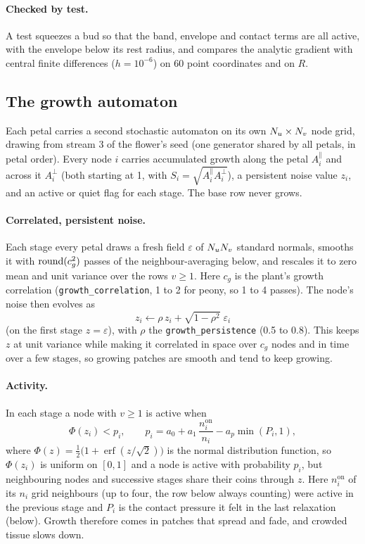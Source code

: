 \paragraph{Checked by test.} A test squeezes a bud so that the band, envelope
and contact terms are all active, with the envelope below its rest radius, and
compares the analytic gradient with central finite differences ($h=10^{-6}$)
on 60 point coordinates and on $R$.

\subsection{The growth automaton}\label{sec:growth}
Each petal carries a second stochastic automaton on its own $N_u\times N_v$
node grid, drawing from stream 3 of the flower's seed (one generator shared by
all petals, in petal order). Every node $i$ carries accumulated growth along
the petal $A^\parallel_i$ and across it $A^\perp_i$ (both starting at 1, with
$S_i = \sqrt{A^\parallel_i A^\perp_i}$), a persistent noise value $z_i$, and an
active or quiet flag for each stage. The base row never grows.

\paragraph{Correlated, persistent noise.} Each stage every petal draws a fresh
field $\varepsilon$ of $N_uN_v$ standard normals, smooths it with
$\operatorname{round}(c_g^2)$ passes of the neighbour-averaging below, and rescales
it to zero mean and unit variance over the rows $v\ge1$. Here $c_g$ is the
plant's growth correlation (\texttt{growth\_\allowbreak correlation}, 1 to 2
for peony, so 1 to 4 passes). The node's noise then evolves as
\[
  z_i \leftarrow \rho\,z_i + \sqrt{1-\rho^2}\;\varepsilon_i
\]
(on the first stage $z = \varepsilon$), with $\rho$ the
\texttt{growth\_persistence} (0.5 to 0.8). This keeps $z$ at unit variance while
making it correlated in space over $c_g$ nodes and in time over a few stages,
so growing patches are smooth and tend to keep growing.

\paragraph{Activity.} In each stage a node with $v\ge1$ is active when
\[
  \Phi(z_i) < p_i, \qquad
  p_i = a_0 + a_1\,\frac{n^{\mathrm{on}}_i}{n_i} - a_p \min(P_i, 1),
\]
where $\Phi(z) = \tfrac12\bigl(1 + \operatorname{erf}(z/\sqrt2)\bigr)$ is the
normal distribution function, so $\Phi(z_i)$ is uniform on $[0,1]$ and a node is
active with probability $p_i$, but neighbouring nodes and successive stages
share their coins through $z$. Here $n^{\mathrm{on}}_i$ of its $n_i$ grid
neighbours (up to four, the row below always counting) were active in the
previous stage and $P_i$ is the contact pressure it felt in the last
relaxation (below). Growth therefore comes in patches that spread and fade,
and crowded tissue slows down.

